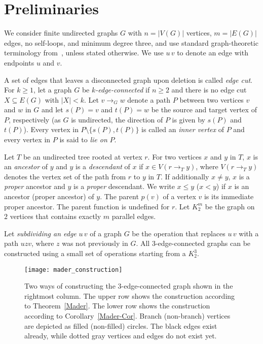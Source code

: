 \documentclass[paper=a4]{scrartcl}
\newcommand{\edge}[2]{\ensuremath{#1\,#2}}
\begin{document}
\section{Preliminaries}\label{preliminaries}

We consider finite undirected graphs $G$ with $n = |V(G)|$ vertices, $m = |E(G)|$ edges, no self-loops, and minimum degree three, and use standard graph-theoretic terminology from~\cite{Bondy2008}, unless stated otherwise. We use $\edge{u}{v}$ to denote an edge with endpoints $u$ and $v$.

A set of edges that leaves a disconnected graph upon deletion is called \emph{edge cut}. For $k \geq 1$, let a graph $G$ be \emph{$k$-edge-connected} if $n \ge 2$ and there is no edge cut $X \subseteq E(G)$ with $|X| < k$. Let $v \rightarrow_G w$ denote a path $P$ between two vertices $v$ and $w$ in $G$ and let $s(P)=v$ and $t(P)=w$ be the source and target vertex of $P$, respectively (as $G$ is undirected, the direction of $P$ is given by $s(P)$ and $t(P)$). Every vertex in $P \setminus \{s(P),t(P)\}$ is called an \emph{inner vertex} of $P$ and every vertex in $P$ is said to \emph{lie on} $P$.

Let $T$ be an undirected tree rooted at vertex $r$. For two vertices $x$ and $y$ in $T$, $x$ is an \emph{ancestor} of $y$ and $y$ is a \emph{descendant} of $x$ if $x \in V(r \rightarrow_T y)$, where $V(r \rightarrow_T y)$ denotes the vertex set of the path from $r$ to $y$ in $T$. If additionally $x \neq y$, $x$ is a \emph{proper} ancestor and $y$ is a \emph{proper} descendant. We write $x \le y$ ($x<y$) if $x$ is an ancestor (proper ancestor) of $y$. The parent $p(v)$ of a vertex $v$ is its immediate proper ancestor. The parent function is undefined for $r$. Let $K^m_2$ be the graph on $2$ vertices that contains exactly $m$ parallel edges.

Let \emph{subdividing an edge} $\edge{u}{v}$ of a graph $G$ be the operation that replaces $\edge{u}{v}$ with a path $uzv$, where $z$ was not previously in $G$. All 3-edge-connected graphs can be constructed using a small set of operations starting from a $K^3_2$.

\begin{figure}[htbp]
\centering
\texttt{[image: mader\_construction]}
\caption{Two ways of constructing the $3$-edge-connected graph shown in the rightmost column. The upper row shows the construction according to Theorem~\ref{Mader}. The lower row shows the construction according to Corollary~\ref{Mader-Cor}. Branch (non-branch) vertices are depicted as filled (non-filled) circles. The black edges exist already, while dotted gray vertices and edges do not exist yet. }
\label{fig:mader_construction}
\end{figure}
\end{document}
